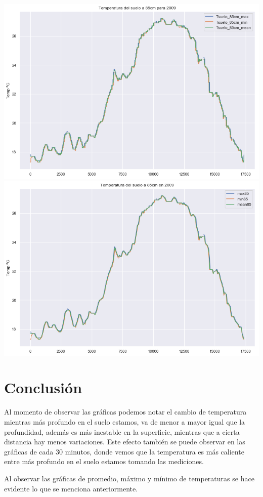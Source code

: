 \documentclass{article}
\begin{document}
\begin{center}
    \includegraphics[scale = 0.3]{TG85.png}
    \includegraphics[scale = 0.3]{TG85S.png}
\end{center}

\section{Conclusión}
Al momento de observar las gráficas podemos notar el cambio de temperatura mientras más profundo en el suelo estamos, va de menor a mayor igual que la profundidad, además es más inestable en la superficie, mientras que a cierta distancia hay menos variaciones. Este efecto también se puede observar en las gráficas de cada 30 minutos, donde vemos que la temperatura es más caliente entre más profundo en el suelo estamos tomando las mediciones.

Al observar las gráficas de promedio, máximo y mínimo de temperaturas se hace evidente lo que se menciona anteriormente.
\end{document}
